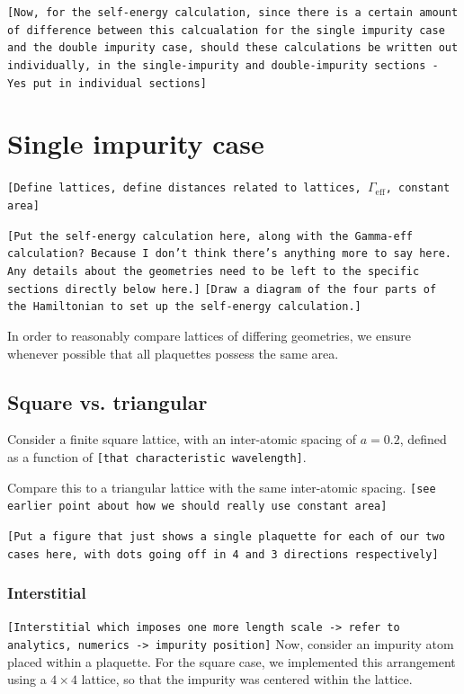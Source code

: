 \documentclass[aps,pra,superscriptaddress,twocolumn]{revtex4-1}
\newcommand{\commentSB}[1]{\texttt{\color{blue}[#1]}}
\newcommand{\commentSO}[1]{\texttt{\color{orange}[#1]}}
\newcommand{\commentTP}[1]{\texttt{\color{green}[#1]}}
\begin{document}

    \commentSB{Now, for the self-energy calculation, since there is a certain amount of difference between this calcualation for the single impurity case and the double impurity case, should these calculations be written out individually, in the single-impurity and double-impurity sections - Yes put in individual sections}



\section{Single impurity case}
\commentSO{Define lattices, define distances related to lattices, $\Gamma_\mathrm{eff}$, constant area}

\commentSB{Put the self-energy calculation here, along with the Gamma-eff calculation? Because I don't think there's anything more to say here. Any details about the geometries need to be left to the specific sections directly below here.}
\commentTP{Draw a diagram of the four parts of the Hamiltonian to set up the self-energy calculation.}


In order to reasonably compare lattices of differing geometries, we ensure whenever possible that all plaquettes possess the same area.

\subsection{Square vs. triangular}

Consider a finite square lattice, with an inter-atomic spacing of $a = 0.2$, defined as a function of \commentSB{that characteristic wavelength}. 

Compare this to a triangular lattice with the same inter-atomic spacing. 
\commentSB{see earlier point about how we should really use constant area}

\commentTP{Put a figure that just shows a single plaquette for each of our two cases here, with dots going off in 4 and 3 directions respectively}

\subsubsection{Interstitial}
\commentSO{Interstitial which imposes one more length scale -> refer to analytics, numerics -> impurity position}
Now, consider an impurity atom placed within a plaquette. For the square case, we implemented this arrangement using a $4\times 4$ lattice, so that the impurity was centered within the lattice. 
\end{document}
